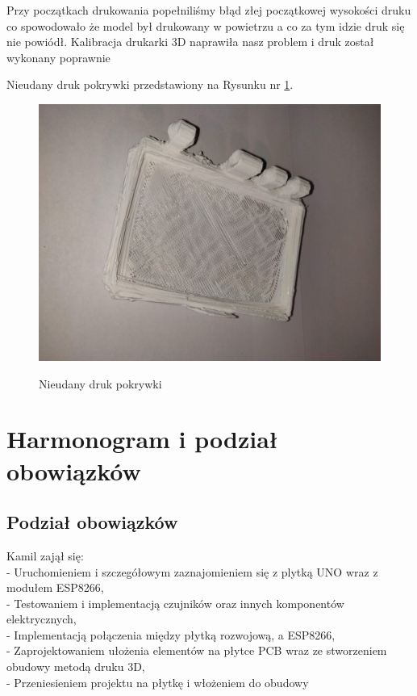 \documentclass[12pt]{article}
\begin{document}
Przy początkach drukowania popełniliśmy błąd złej początkowej wysokości druku co spowodowało że model był drukowany w powietrzu a co za tym idzie druk się nie powiódł. Kalibracja drukarki 3D naprawiła nasz problem i druk został wykonany poprawnie

Nieudany druk pokrywki przedstawiony na Rysunku nr \ref{fig:drukfailed}.
\begin{figure}[!h]
	\begin{center}
		{\includegraphics[width=12cm]{obudowa_broken.jpg}}
	\end{center}
	\caption{Nieudany druk pokrywki}
	\label{fig:drukfailed}
\end{figure}

\newpage
\section{Harmonogram i podział obowiązków}

\subsection{Podział obowiązków}
Kamil zajął się:\\
- Uruchomieniem i szczegółowym zaznajomieniem się z plytką UNO wraz z modułem ESP8266,\\
- Testowaniem i implementacją czujników oraz innych komponentów elektrycznych,\\
- Implementacją połączenia między płytką rozwojową, a ESP8266,\\
- Zaprojektowaniem ułożenia elementów na płytce PCB wraz ze stworzeniem obudowy metodą druku 3D,\\
- Przeniesieniem projektu na płytkę  i włożeniem do obudowy\\
\end{document}
